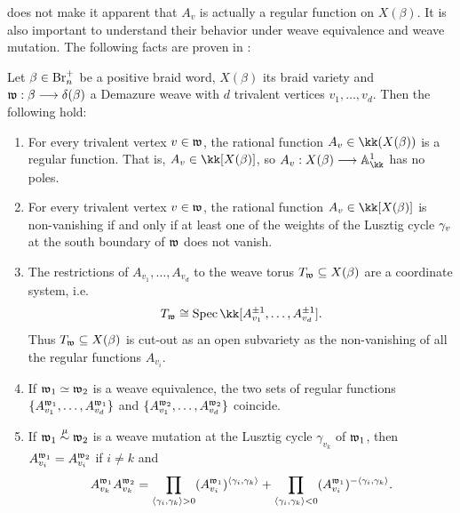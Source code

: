  does not make it apparent that $A_v$ is actually a regular function on $X(\beta)$. It is also important to understand their behavior under weave equivalence and weave mutation. The following facts are proven in \cite[Section 5.2 \& 5.3]{CGGLSS25}:

\begin{fthm}\label{thm:cluster_variables_weave}
Let $\beta\in\mbox{Br}_n^+$ be a positive braid word, $X(\beta)$ its braid variety and $\mathfrak{w}:\beta\longrightarrow\delta(\beta)$ a Demazure weave with $d$ trivalent vertices $v_1,\ldots,v_d$. Then the following hold:

\begin{enumerate}
    \item For every trivalent vertex $v\in\mathfrak{w}$, the rational function $A_v\in\kk(X(\beta))$ is a regular function. That is, $A_v\in\kk[X(\beta)]$, so $A_v:X(\beta)\lr\mathbb{A}^1_\kk$ has no poles.\\

    \item For every trivalent vertex $v\in\mathfrak{w}$, the rational function $A_v\in\kk[X(\beta)]$ is non-vanishing if and only if at least one of the weights of the Lusztig cycle $\gamma_v$ at the south boundary of $\mathfrak{w}$ does not vanish.\\

    \item The restrictions of $A_{v_1},\ldots,A_{v_d}$ to the weave torus $T_{\mathfrak{w}}\subseteq X(\beta)$ are a coordinate system, i.e.~
    $$T_\w\cong \Spec\kk[A_{v_1}^{\pm1},\ldots,A_{v_d}^{\pm1}].$$
    Thus $T_{\mathfrak{w}}\subseteq X(\beta)$ is cut-out as an open subvariety as the non-vanishing of all the regular functions $A_{v_i}$.\\

    \item If $\mathfrak{w}_1\simeq\mathfrak{w}_2$ is a weave equivalence, the two sets of regular functions $\{A^{\mathfrak{w}_1}_{v_1},\ldots,A^{\mathfrak{w}_1}_{v_d}\}$ and $\{A^{\mathfrak{w}_2}_{v_1},\ldots,A^{\mathfrak{w}_2}_{v_d}\}$ coincide.\\

    \item If $\mathfrak{w}_1\stackrel{\mu}{\sim}\mathfrak{w}_2$ is a weave mutation at the Lusztig cycle $\gamma_{v_k}$ of $\mathfrak{w}_1$, then $A^{\mathfrak{w}_1}_{v_i}=A^{\mathfrak{w}_2}_{v_i}$ if $i\neq k$ and
    \begin{equation}\label{eq:cluster_mutation_weave_variables}
        \displaystyle A^{\mathfrak{w}_1}_{v_k}A^{\mathfrak{w}_2}_{v_k}=\prod_{\langle \gamma_i,\gamma_k\rangle>0} (A^{\mathfrak{w}_1}_{v_i})^{\langle \gamma_i,\gamma_k\rangle}+\prod_{\langle \gamma_i,\gamma_k\rangle<0} (A^{\mathfrak{w}_1}_{v_i})^{-\langle \gamma_i,\gamma_k\rangle}.
    \end{equation}
\end{enumerate}
\end{fthm}
